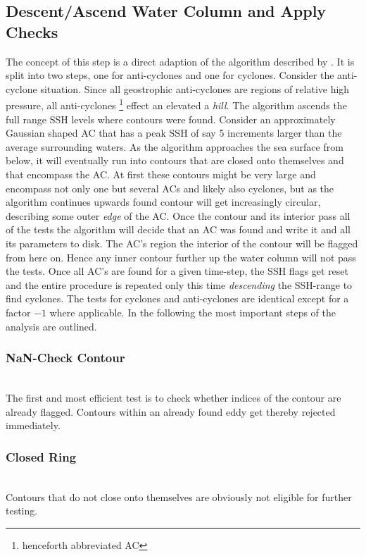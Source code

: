 \subsection{Descent/Ascend Water Column and Apply Checks}
The concept of this step is a direct adaption of the algorithm described
by \cite{Chelton2011}. It is split into two steps, one for anti-cyclones and one
for cyclones. Consider \eg the anti-cyclone situation. Since all
geostrophic anti-cyclones are regions of relative high pressure, all
anti-cyclones \footnote{henceforth abbreviated AC} effect an elevated \SSH \ie
a \textit{hill}. The algorithm ascends the full range SSH levels where
contours were found. Consider an approximately Gaussian shaped AC that has a
peak SSH of say 5 increments larger than the average surrounding waters. 
As the algorithm approaches the sea surface from below, it will eventually run
into contours that are closed onto themselves and that encompass the AC. At
first these contours might be very large and encompass not only one but several
ACs and likely also cyclones, but as the algorithm continues upwards found
contour will get increasingly circular, describing some outer \textit{edge} of
the AC. Once the contour and its interior pass all of the tests the algorithm
will decide that an AC was found and write it and all its parameters to disk.
The AC's region \ie the interior of the contour will be flagged from here on.
Hence any inner contour further up the water column will not pass the tests.
Once all AC's are found for a given time-step, the SSH flags get reset and the
entire procedure is repeated only this time \textit{descending} the SSH-range to
find cyclones. The tests for cyclones and anti-cyclones are identical except for
a factor $-1$ where applicable. In the following the most important steps of the
analysis are
outlined. 
\subsubsection{NaN-Check Contour}
\\
The first and most efficient test is to check whether indices of the
contour are already flagged. Contours within an already found eddy get thereby
rejected immediately.
\subsubsection{Closed Ring}
\\
Contours that do not close onto themselves are obviously not eligible for
further testing.
